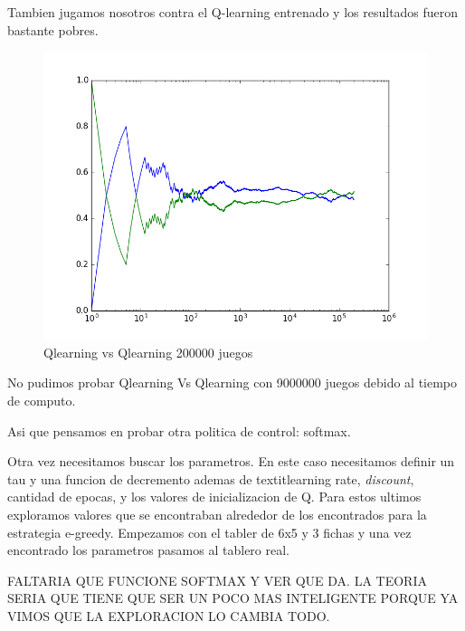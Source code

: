 Tambien jugamos nosotros contra el Q-learning entrenado y los resultados fueron bastante pobres. 

\begin{figure}[h]
 \centering
 \begin{minipage}{.45\textwidth}
	\centering
	\includegraphics[scale=0.35]{img/QlearningQlearningEgreedy2000007x6(4).png}
       \caption{Qlearning vs Qlearning 200000 juegos}
  \end{minipage}
\end{figure}

No pudimos probar Qlearning Vs Qlearning con 9000000 juegos debido al tiempo de computo.



Asi que pensamos en probar otra politica de control: softmax.

Otra vez necesitamos buscar los parametros. En este caso necesitamos definir un tau y una funcion de decremento ademas de textit{learning rate}, \textit{discount}, cantidad de epocas, y los valores de inicializacion de Q. Para estos ultimos exploramos valores que se encontraban alrededor de los encontrados para la estrategia e-greedy.
Empezamos con el tabler de 6x5 y 3 fichas y una vez encontrado los parametros pasamos al tablero real.



{\huge FALTARIA QUE FUNCIONE SOFTMAX Y VER QUE DA. 
LA TEORIA SERIA QUE TIENE QUE SER UN POCO MAS INTELIGENTE PORQUE YA VIMOS QUE LA EXPLORACION LO CAMBIA TODO. 
}\\


